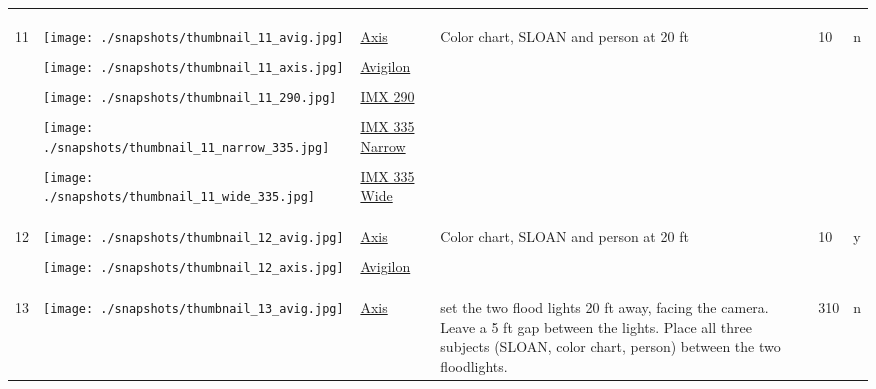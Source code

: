 \documentclass{article}%
\begin{document}
\begin{longtabu}{m{2.5cm} m{4cm} m{2cm} m{4cm} m{2cm} m{2cm}}
&&&&&\\%
&&&&&\\%
\hline%
&&&&&\\%
11&\texttt{[image: ./snapshots/thumbnail\_11\_avig.jpg]}&\href{https://drive.google.com/file/d/1TA8mg0guTv4qlYRPEHv_uCqfUPBe4Vi0/view?usp=sharing}{Axis}&Color chart, SLOAN and person at 20 ft&10&n\\%
&&&&&\\%
&\texttt{[image: ./snapshots/thumbnail\_11\_axis.jpg]}&\href{https://drive.google.com/file/d/1f145baq6-oiCN7YpWAnfAIqu7E-dVFes/view?usp=sharing}{Avigilon}&&&\\%
&&&&&\\%
&\texttt{[image: ./snapshots/thumbnail\_11\_290.jpg]}&\href{https://drive.google.com/file/d/1wVfkQB-EgZEhl_q3vB1dNifu_4RdC5nP/view?usp=sharing}{IMX 290}&&&\\%
&&&&&\\%
&\texttt{[image: ./snapshots/thumbnail\_11\_narrow\_335.jpg]}&\href{https://drive.google.com/file/d/1FYKjAjcLUz87-altLsJ9yHvDV7WGXTED/view?usp=sharing}{IMX 335 Narrow}&&&\\%
&&&&&\\%
&\texttt{[image: ./snapshots/thumbnail\_11\_wide\_335.jpg]}&\href{https://drive.google.com/file/d/1_m1ofb-on9AjmlrGlWbdNJVbdM3sehTP/view?usp=sharing}{IMX 335 Wide}&&&\\%
&&&&&\\%
&&&&&\\%
\hline%
&&&&&\\%
12&\texttt{[image: ./snapshots/thumbnail\_12\_avig.jpg]}&\href{https://drive.google.com/file/d/1Fp85EVAGogtYR1FxtgzUG6glWf4BeYhW/view?usp=sharing}{Axis}&Color chart, SLOAN and person at 20 ft&10&y\\%
&&&&&\\%
&\texttt{[image: ./snapshots/thumbnail\_12\_axis.jpg]}&\href{https://drive.google.com/file/d/1j4AIMAGLnTgsWVKESGzzzne5nl5D2h-d/view?usp=sharing}{Avigilon}&&&\\%
&&&&&\\%
&&&&&\\%
\hline%
&&&&&\\%
13&\texttt{[image: ./snapshots/thumbnail\_13\_avig.jpg]}&\href{https://drive.google.com/file/d/1pXmftF0TeaxWYDagbG5k560e-FQDwkG3/view?usp=sharing}{Axis}&set the two flood lights 20 ft away, facing the camera. Leave a 5 ft gap between the lights. Place all three subjects (SLOAN, color chart, person) between the two floodlights.&310&n\\%

\end{longtabu}
\end{document}
